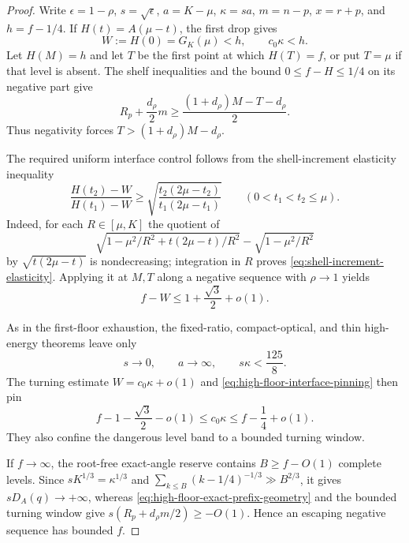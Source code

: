 \documentclass[11pt]{article}
\theoremstyle{remark}
\begin{document}
\begin{proof}
Write $\epsilon=1-\rho$, $s=\sqrt\epsilon$, $a=K-\mu$,
$\kappa=sa$, $m=n-p$, $x=r+p$, and $h=f-1/4$.  If
$H(t)=A(\mu-t)$, the first drop gives
\[
 W:=H(0)=G_K(\mu)<h,
 \qquad c_0\kappa<h.
\]
Let $H(M)=h$ and let $T$ be the first point at which $H(T)=f$, or put
$T=\mu$ if that level is absent.  The shelf inequalities and the bound
$0\leq f-H\leq1/4$ on its negative part give
\begin{equation}
 R_p+\frac{d_\rho}{2}m
 \geq\frac{(1+d_\rho)M-T-d_\rho}{2}.
 \label{eq:high-floor-exact-prefix-geometry}
\end{equation}
Thus negativity forces $T>(1+d_\rho)M-d_\rho$.

The required uniform interface control follows from the shell-increment
elasticity inequality
\begin{equation}
 \frac{H(t_2)-W}{H(t_1)-W}
 \geq\sqrt{\frac{t_2(2\mu-t_2)}{t_1(2\mu-t_1)}}
 \qquad(0<t_1<t_2\leq\mu).
 \label{eq:shell-increment-elasticity}
\end{equation}
Indeed, for each $R\in[\mu,K]$ the quotient of
\[
 \sqrt{1-\mu^2/R^2+t(2\mu-t)/R^2}
 -\sqrt{1-\mu^2/R^2}
\]
by $\sqrt{t(2\mu-t)}$ is nondecreasing; integration in $R$ proves
\eqref{eq:shell-increment-elasticity}.  Applying it at $M,T$ along a
negative sequence with $\rho\to1$ yields
\begin{equation}
 f-W\leq1+\frac{\sqrt3}{2}+o(1).
 \label{eq:high-floor-interface-pinning}
\end{equation}

As in the first-floor exhaustion, the fixed-ratio, compact-optical, and
thin high-energy theorems leave only
\[
 s\to0,\qquad a\to\infty,\qquad s\kappa<\frac{125}{8}.
\]
The turning estimate $W=c_0\kappa+o(1)$ and
\eqref{eq:high-floor-interface-pinning} then pin
\begin{equation}
 f-1-\frac{\sqrt3}{2}-o(1)
 \leq c_0\kappa\leq f-\frac14+o(1).
 \label{eq:high-floor-kappa-pinning}
\end{equation}
They also confine the dangerous level band to a bounded turning window.

If $f\to\infty$, the root-free exact-angle reserve contains
$B\geq f-O(1)$ complete levels.  Since
$sK^{1/3}=\kappa^{1/3}$ and
$\sum_{k\leq B}(k-1/4)^{-1/3}\gg B^{2/3}$, it gives
$sD_A(q)\to+\infty$, whereas
\eqref{eq:high-floor-exact-prefix-geometry} and the bounded turning
window give
$s(R_p+d_\rho m/2)\geq-O(1)$.  Hence an escaping negative sequence has
bounded $f$.


\end{proof}
\end{document}
